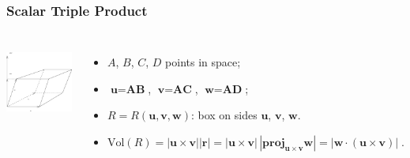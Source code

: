 \begin{frame}[label=current]
\frametitle{Scalar Triple Product}
\begin{columns}
  \includegraphics[height=1in]{../../modules/vectors/pictures/ok-volume_box.eps}

\begin{itemize}
\item $A$, $B$, $C$, $D$ points in space;
\item<2-> $\textbf{u} = \textbf{AB}$, $\textbf{v}=\textbf{AC}$, $\textbf{w}=\textbf{AD}$;
\item<3-> $R=R(\textbf{u},\textbf{v},\textbf{w})$: box on sides $\textbf{u}$, $\textbf{v}$, $\textbf{w}$.\pause
\item<4-> $\text{Vol}(R) = |\textbf{u} \times \textbf{v}| |\textbf{r}| = |\textbf{u} \times \textbf{v}| \, |\textbf{proj}_{\bm{u} \times \bm{v}} \textbf{w}| =
|\textbf{w} \cdot (\textbf{u} \times \textbf{v})|\; .$
\end{itemize}
\end{columns}
\end{frame}